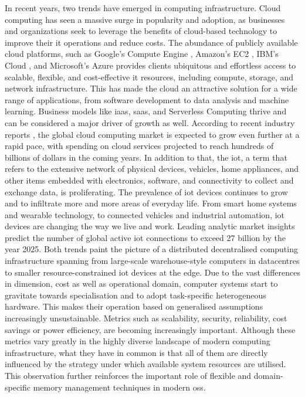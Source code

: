 In recent years, two trends have emerged in computing infrastructure.
Cloud computing has seen a massive surge in popularity and adoption, as businesses and organizations seek to leverage the benefits of cloud-based technology to improve their \acs{it} operations and reduce costs.
The abundance of publicly available cloud platforms, such as Google’s Compute Engine \cite{google-compute-engine}, Amazon’s EC2 \cite{aws-ec2}, IBM’s Cloud \cite{ibm-cloud}, and Microsoft’s Azure \cite{microsoft-azure} provides clients ubiquitous and effortless access to scalable, flexible, and cost-effective \acs{it} resources, including compute, storage, and network infrastructure.
This has made the cloud an attractive solution for a wide range of applications, from software development to data analysis and machine learning.
Business models like \ac{iaas}, \ac{saas}, and Serverless Computing thrive and can be considered a major driver of growth as well.
According to recent industry reports \cite{gartner2022}, the global cloud computing market is expected to grow even further at a rapid pace, with spending on cloud services projected to reach hundreds of billions of dollars in the coming years.
In addition to that, the \ac{iot}, a term that refers to the extensive network of physical devices, vehicles, home appliances, and other items embedded with electronics, software, and connectivity to collect and exchange data, is proliferating.
The prevalence of \ac{iot} devices continues to grow and to infiltrate more and more areas of everyday life.
From smart home systems and wearable technology, to connected vehicles and industrial automation, \ac{iot} devices are changing the way we live and work.
Leading analytic market insights \cite{iotanalytics2022} predict the number of global active \ac{iot} connections to exceed 27 billion by the year 2025.
Both trends paint the picture of a distributed decentralised computing infrastructure spanning from large-scale warehouse-style computers in datacentres to smaller resource-constrained \ac{iot} devices at the edge.
Due to the vast differences in dimension, cost as well as operational domain, computer systems start to gravitate towards specialisation and to adopt task-specific heterogeneous hardware.
This makes their operation based on generalised assumptions increasingly unsustainable.
Metrics such as scalability, security, reliability, cost savings or power efficiency, are becoming increasingly important.
Although these metrics vary greatly in the highly diverse landscape of modern computing infrastructure, what they have in common is that all of them are directly influenced by the strategy under which available system resources are utilised.
This observation further reinforces the important role of flexible and domain-specific memory management techniques in modern \acp{os}.

